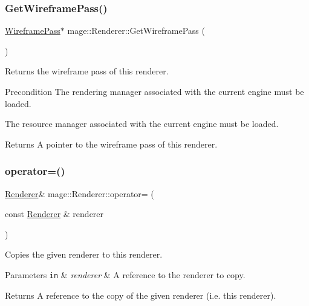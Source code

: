 \subsubsection{\texorpdfstring{Get\+Wireframe\+Pass()}{GetWireframePass()}}
{\footnotesize\ttfamily \hyperlink{classmage_1_1_wireframe_pass}{Wireframe\+Pass}$\ast$ mage\+::\+Renderer\+::\+Get\+Wireframe\+Pass (\begin{DoxyParamCaption}{ }\end{DoxyParamCaption})}

Returns the wireframe pass of this renderer.

\begin{DoxyPrecond}{Precondition}
The rendering manager associated with the current engine must be loaded. 

The resource manager associated with the current engine must be loaded. 
\end{DoxyPrecond}
\begin{DoxyReturn}{Returns}
A pointer to the wireframe pass of this renderer. 
\end{DoxyReturn}
\hypertarget{classmage_1_1_renderer_a2762ead5f771ae95e4293cd7eb1a2834}{}\label{classmage_1_1_renderer_a2762ead5f771ae95e4293cd7eb1a2834} 
\subsubsection{\texorpdfstring{operator=()}{operator=()}\hspace{0.1cm}{\footnotesize\ttfamily [1/2]}}
{\footnotesize\ttfamily \hyperlink{classmage_1_1_renderer}{Renderer}\& mage\+::\+Renderer\+::operator= (\begin{DoxyParamCaption}\item[{const \hyperlink{classmage_1_1_renderer}{Renderer} \&}]{renderer }\end{DoxyParamCaption})\hspace{0.3cm}{\ttfamily [delete]}}

Copies the given renderer to this renderer.


\begin{DoxyParams}[1]{Parameters}
\mbox{\tt in}  & {\em renderer} & A reference to the renderer to copy. \\
\hline
\end{DoxyParams}
\begin{DoxyReturn}{Returns}
A reference to the copy of the given renderer (i.\+e. this renderer). 
\end{DoxyReturn}
\hypertarget{classmage_1_1_renderer_aa381bb89bffdc8ea2d8e3625e28cd28a}{}\label{classmage_1_1_renderer_aa381bb89bffdc8ea2d8e3625e28cd28a} 

